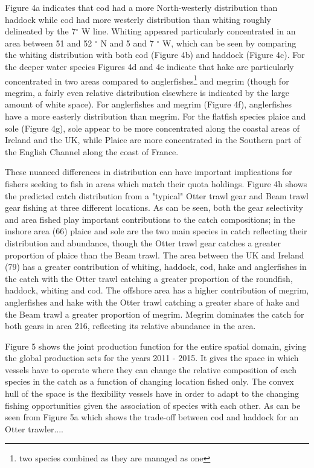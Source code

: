 \documentclass{nature}
\begin{document}
\begin{linenumbers}
Figure 4a indicates that cod had a more North-westerly distribution than
haddock while cod had more westerly distribution than whiting roughly
delineated by the 7$^{\circ}$ W line. Whiting appeared particularly
concentrated in an area between 51 and 52 $^{\circ}$ N and 5 and 7 $^{\circ}$
W, which can be seen by comparing the whiting distribution with both cod
(Figure 4b) and haddock (Figure 4c). For the deeper water species Figures 4d and 4e
indicate that hake are particularly concentrated in two areas compared to
anglerfishes\footnote{two species combined as they are managed as one} and
megrim (though for megrim, a fairly even relative distribution elsewhere is
indicated by the large amount of white space). For anglerfishes and megrim
(Figure 4f), anglerfishes have a more easterly distribution than megrim. For
the flatfish species plaice and sole (Figure 4g), sole appear to be more
concentrated along the coastal areas of Ireland and the UK, while Plaice are
more concentrated in the Southern part of the English Channel along the coast
of France.

These nuanced differences in distribution can have important implications for
fishers seeking to fish in areas which match their quota holdings. Figure 4h
shows the predicted catch distribution from a "typical" Otter trawl gear and
Beam trawl gear fishing at three different locations. As can be seen, both the
gear selectivity and area fished play important contributions to the catch
compositions; in the inshore area (66) plaice and sole are the two main species
in catch reflecting their distribution and abundance, though the Otter trawl
gear catches a greater proportion of plaice than the Beam trawl. The area
between the UK and Ireland (79) has a greater contribution of whiting, haddock,
cod, hake and anglerfishes in the catch with the Otter trawl catching a greater
proportion of the roundfish, haddock, whiting and cod. The offshore area has a
higher contribution of megrim, anglerfishes and hake with the Otter trawl
catching a greater share of hake and the Beam trawl a greater proportion of
megrim. Megrim dominates the catch for both gears in area 216, reflecting its
relative abundance in the area.

Figure 5 shows the joint production function for the entire spatial domain,
giving the global production sets for the years 2011 - 2015. It gives the space
in which vessels have to operate where they can change the relative composition
of each species in the catch as a function of changing location fished only.
The convex hull of the space is the flexibility vessels have in order to adapt
to the changing fishing opportunities given the association of species with
each other\cite{Reimer2017}. As can be seen from Figure 5a which shows the
trade-off between cod and haddock for an Otter trawler....


\end{linenumbers}
\end{document}
